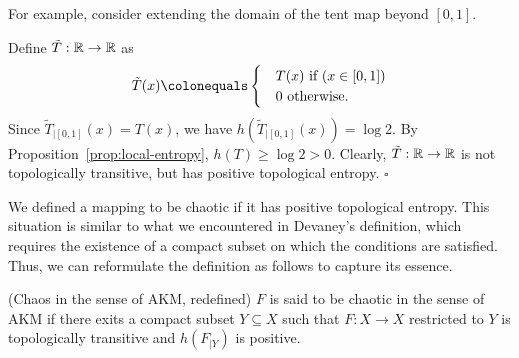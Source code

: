 \documentclass[10pt,twoside,draft]{book}
\begin{document}
For example, consider extending the domain of the tent map beyond $[0,1]$.
\begin{example}
  Define $\tilde{T}: \mathbb{R} \to \mathbb{R}$ as
  \begin{equation*}
    \tilde{T}(x) 
    \ceq \begin{cases}
      &T(x) \mbox{ if } (x \in [0,1]) \\
      &0 \mbox{ otherwise}.
    \end{cases}
  \end{equation*}
  Since $\tilde{T}_{|[0,1]}(x) = T(x)$, we have $h(\tilde{T}_{|[0,1]}(x)) = \log 2$. 
  By Proposition~\ref{prop:local-entropy}, $h(T) \geq \log 2 > 0$.
  Clearly, $\tilde{T}: \mathbb{R} \to \mathbb{R}$ is not topologically transitive, but has positive topological entropy.
  $\square$
\end{example}
We defined a mapping to be chaotic if it has positive topological entropy.
This situation is similar to what we encountered in Devaney's definition, which requires the existence of a compact subset on which the conditions are satisfied.
Thus, we can reformulate the definition as follows to capture its essence.
\begin{definition}
  (Chaos in the sense of AKM, redefined)
  $F$ is said to be chaotic in the sense of AKM if there exits a compact subset $Y \subseteq X$ such that $F: X \to X$ restricted to $Y$ is topologically transitive and $h(F_{|Y})$ is positive.
\end{definition}
\end{document}
